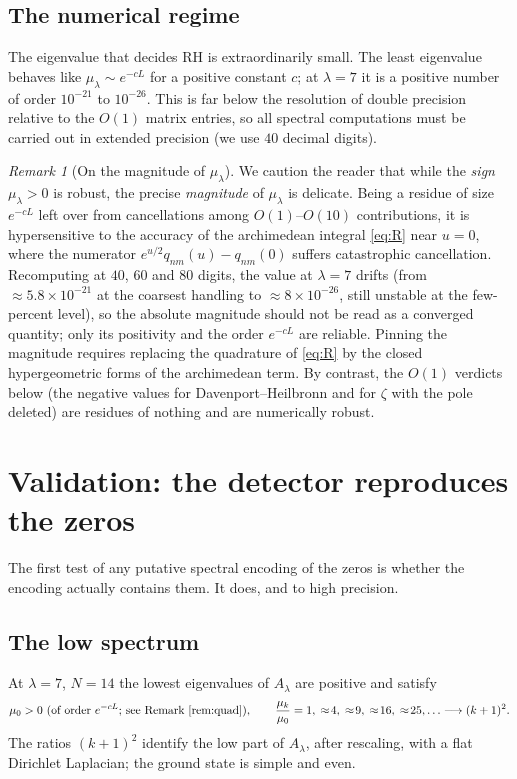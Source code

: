 \documentclass[11pt]{amsart}
\theoremstyle{definition}
\theoremstyle{remark}
\newtheorem{remark}[theorem]{Remark}
\newcommand{\lam}{\lambda}
\begin{document}
\subsection{The numerical regime}
The eigenvalue that decides RH is extraordinarily small. The least eigenvalue behaves like $\mu_\lam\sim e^{-cL}$ for a positive constant $c$; at $\lam=7$ it is a positive number of order $10^{-21}$ to $10^{-26}$. This is far below the resolution of double precision relative to the $O(1)$ matrix entries, so all spectral computations must be carried out in extended precision (we use $40$ decimal digits).

\begin{remark}[On the magnitude of $\mu_\lam$]\label{rem:quad}
We caution the reader that while the \emph{sign} $\mu_\lam>0$ is robust, the precise \emph{magnitude} of $\mu_\lam$ is delicate. Being a residue of size $e^{-cL}$ left over from cancellations among $O(1)$--$O(10)$ contributions, it is hypersensitive to the accuracy of the archimedean integral \eqref{eq:R} near $u=0$, where the numerator $e^{u/2}q_{nm}(u)-q_{nm}(0)$ suffers catastrophic cancellation. Recomputing at $40$, $60$ and $80$ digits, the value at $\lam=7$ drifts (from $\approx5.8\times10^{-21}$ at the coarsest handling to $\approx8\times10^{-26}$, still unstable at the few-percent level), so the absolute magnitude should not be read as a converged quantity; only its positivity and the order $e^{-cL}$ are reliable. Pinning the magnitude requires replacing the quadrature of \eqref{eq:R} by the closed hypergeometric forms of the archimedean term. By contrast, the $O(1)$ verdicts below (the negative values for Davenport--Heilbronn and for $\zeta$ with the pole deleted) are residues of nothing and are numerically robust.
\end{remark}

\section{Validation: the detector reproduces the zeros}\label{sec:validation}

The first test of any putative spectral encoding of the zeros is whether the encoding actually contains them. It does, and to high precision.

\subsection{The low spectrum} At $\lam=7$, $N=14$ the lowest eigenvalues of $A_\lam$ are positive and satisfy
\[
\mu_0>0\ \text{(of order }e^{-cL}\text{; see Remark~\ref{rem:quad})},\qquad \frac{\mu_k}{\mu_0}=1,\;\approx\!4,\;\approx\!9,\;\approx\!16,\;\approx\!25,\ldots\longrightarrow (k+1)^2 .
\]
The ratios $(k+1)^2$ identify the low part of $A_\lam$, after rescaling, with a flat Dirichlet Laplacian; the ground state is simple and even.
\end{document}
